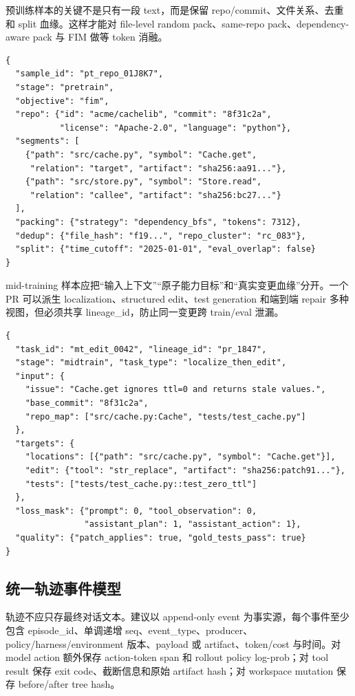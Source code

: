 \documentclass[10pt,a4paper,UTF8,fontset=none]{ctexart}
\newcommand{\ident}[1]{{\rmfamily #1}}
\begin{document}
预训练样本的关键不是只有一段 \ident{text}，而是保留 repo/commit、文件关系、去重和 split 血缘。这样才能对 file-level random pack、same-repo pack、dependency-aware pack 与 FIM 做等 token 消融。

\begin{lstlisting}[style=codeblock,caption={Repo-level 预训练/FIM 样例},label={zh:lst:pretrain-sample}]
{
  "sample_id": "pt_repo_01J8K7",
  "stage": "pretrain",
  "objective": "fim",
  "repo": {"id": "acme/cachelib", "commit": "8f31c2a",
           "license": "Apache-2.0", "language": "python"},
  "segments": [
    {"path": "src/cache.py", "symbol": "Cache.get",
     "relation": "target", "artifact": "sha256:aa91..."},
    {"path": "src/store.py", "symbol": "Store.read",
     "relation": "callee", "artifact": "sha256:bc27..."}
  ],
  "packing": {"strategy": "dependency_bfs", "tokens": 7312},
  "dedup": {"file_hash": "f19...", "repo_cluster": "rc_083"},
  "split": {"time_cutoff": "2025-01-01", "eval_overlap": false}
}
\end{lstlisting}

mid-training 样本应把“输入上下文”“原子能力目标”和“真实变更血缘”分开。一个 PR 可以派生 localization、structured edit、test generation 和端到端 repair 多种视图，但必须共享 \ident{lineage\_id}，防止同一变更跨 train/eval 泄漏。

\begin{lstlisting}[style=codeblock,caption={PR/Issue 派生的 mid-training 原子任务},label={zh:lst:midtrain-sample}]
{
  "task_id": "mt_edit_0042", "lineage_id": "pr_1847",
  "stage": "midtrain", "task_type": "localize_then_edit",
  "input": {
    "issue": "Cache.get ignores ttl=0 and returns stale values.",
    "base_commit": "8f31c2a",
    "repo_map": ["src/cache.py:Cache", "tests/test_cache.py"]
  },
  "targets": {
    "locations": [{"path": "src/cache.py", "symbol": "Cache.get"}],
    "edit": {"tool": "str_replace", "artifact": "sha256:patch91..."},
    "tests": ["tests/test_cache.py::test_zero_ttl"]
  },
  "loss_mask": {"prompt": 0, "tool_observation": 0,
                "assistant_plan": 1, "assistant_action": 1},
  "quality": {"patch_applies": true, "gold_tests_pass": true}
}
\end{lstlisting}

\subsection{统一轨迹事件模型}

轨迹不应只存最终对话文本。建议以 append-only event 为事实源，每个事件至少包含 \ident{episode\_id}、单调递增 \ident{seq}、\ident{event\_type}、producer、policy/harness/environment 版本、payload 或 artifact、token/cost 与时间。对 model action 额外保存 action-token span 和 rollout policy log-prob；对 tool result 保存 exit code、截断信息和原始 artifact hash；对 workspace mutation 保存 before/after tree hash。
\end{document}

